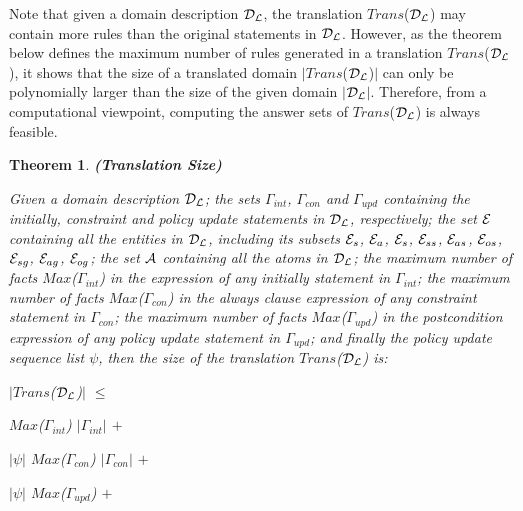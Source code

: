 \documentclass[11pt]{report}
\newtheorem{vvtheorem}{Theorem}[chapter]
\newenvironment{vtheorem}[1]
{
  \begin{vvtheorem}{{\bf (#1)}}
}
{
  \end{vvtheorem}
}
\newenvironment{vquote}
{
  \begin{list}{}{\leftmargin 1em}\item[]
}
{
  \end{list}
}
\begin{document}
          Note that given a domain description ${\cal D_{L}}$, the translation
          $Trans$(${\cal D_{L}}$) may contain more rules than the original
          statements in ${\cal D_{L}}$. However, as the theorem below defines
          the maximum number of rules generated in a translation
          $Trans$(${\cal D_{L}}$), it shows that the size of a translated
          domain $|$$Trans$(${\cal D_{L}}$)$|$ can only be polynomially larger
          than the size of the given domain $|$${\cal D_{L}}$$|$. Therefore,
          from a computational viewpoint, computing the answer sets of
          $Trans$(${\cal D_{L}}$) is always feasible.

          \begin{vtheorem}{Translation Size}
            \label{the-size}
            Given a domain description ${\cal D_{L}}$; the sets $\Gamma_{int}$,
            $\Gamma_{con}$ and $\Gamma_{upd}$ containing the initially,
            constraint and policy update statements in ${\cal D_{L}}$,
            respectively; the set ${\cal E}$ containing all the entities in
            ${\cal D_{L}}$, including its subsets ${\cal E}_{s}$,
            ${\cal E}_{a}$, ${\cal E}_{s}$, ${\cal E}_{ss}$, ${\cal E}_{as}$,
            ${\cal E}_{os}$, ${\cal E}_{sg}$, ${\cal E}_{ag}$, ${\cal E}_{og}$;
            the set ${\cal A}$ containing all the atoms in ${\cal D_{L}}$; the
            maximum number of facts $Max$($\Gamma_{int}$) in the expression of
            any {\em initially} statement in $\Gamma_{int}$; the maximum
            number of facts $Max$($\Gamma_{con}$) in the {\em always} clause
            expression of any constraint statement in $\Gamma_{con}$; the
            maximum number of facts $Max$($\Gamma_{upd}$) in the postcondition
            expression of any policy update statement in $\Gamma_{upd}$; and
            finally the policy update sequence list $\psi$, then the size of
            the translation $Trans$(${\cal D_{L}}$) is:

            \begin{vquote}
              $|$$Trans$(${\cal D_{L}}$)$|$ $\leq$
 
              \hspace{1em}
              $Max$($\Gamma_{int}$) $|\Gamma_{int}|$ $+$
 
              \hspace{1em}
              $|\psi|$ $Max$($\Gamma_{con}$) $|\Gamma_{con}|$ $+$
 
              \hspace{1em}
              $|\psi|$ $Max$($\Gamma_{upd}$) $+$
 

\end{vquote}
\end{vtheorem}
\end{document}
